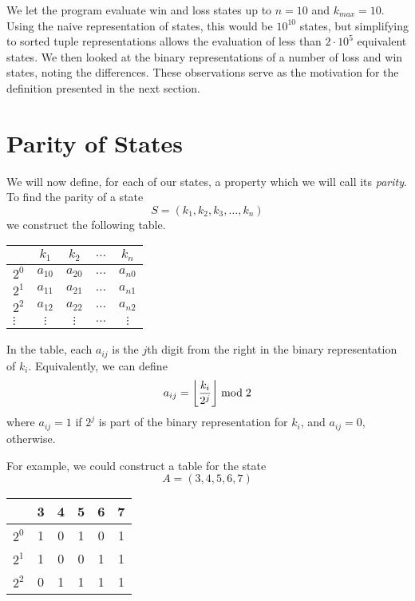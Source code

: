\documentclass[12pt]{article}
\DeclarePairedDelimiter{\floor}{\lfloor}{\rfloor}
\begin{document}
We let the program evaluate win and loss states up to $n=10$ and $k_{max}=10$. Using the naive representation of states, this would be $10^{10}$ states, but simplifying to sorted tuple representations allows the evaluation of less than $2\cdot 10^5$ equivalent states. We then looked at the binary representations of a number of loss and win states, noting the differences. These observations serve as the motivation for the definition presented in the next section.

\section{Parity of States}
We will now define, for each of our states, a property which we will call its \emph{parity}. To find the parity of a state
\[S = (k_1, k_2, k_3, \dots, k_n)\]
we construct the following table.
\begin{center}
    \begin{tabular}{l|cccc}
         & $k_1$ & $k_2$ & $\dots$ & $k_n$ \\
         \hline
        \cellcolor{white} $2^0$ & $a_{10}$ & $a_{20}$ & $\dots$ & $a_{n0}$ \\
        \cellcolor{white} $2^1$ & $a_{11}$ & $a_{21}$ & $\dots$ & $a_{n1}$ \\
        \cellcolor{white} $2^2$ & $a_{12}$ & $a_{22}$ & $\dots$ & $a_{n2}$ \\
        $\vdots$ & $\vdots$ & $\vdots$ & $\dots$ & $\vdots$
    \end{tabular}
\end{center}

In the table, each $a_{ij}$ is the $j$th digit from the right in the binary representation of $k_i$. Equivalently, we can define
\[a_{ij} = \floor*{\frac{k_i}{2^j}} \bmod 2\]
where $a_{ij} = 1$ if $2^j$ is part of the binary representation for $k_i$, and $a_{ij} = 0$, otherwise. 

\newpage
For example, we could construct a table for the state
\[A = (3,4,5,6,7)\]
\begin{center}
    \begin{tabular}{c|ccccc}
         & 3 & 4 & 5 & 6 & 7 \\
         \hline
        \cellcolor{white} $2^0$ & 1 & 0 & 1 & 0 & 1 \\
        \cellcolor{white} $2^1$ & 1 & 0 & 0 & 1 & 1 \\
        \cellcolor{white} $2^2$ & 0 & 1 & 1 & 1 & 1
    \end{tabular}
\end{center}
\end{document}
